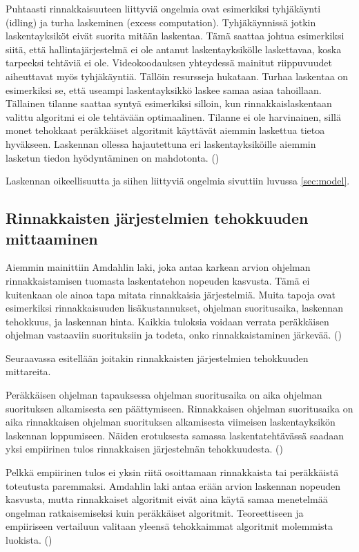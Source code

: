 Puhtaasti rinnakkaisuuteen liittyviä ongelmia ovat esimerkiksi tyhjäkäynti
(idling) ja turha laskeminen (excess computation). Tyhjäkäynnissä jotkin
laskentayksiköt eivät suorita mitään laskentaa. Tämä saattaa johtua esimerkiksi
siitä, että hallintajärjestelmä ei ole antanut laskentayksikölle laskettavaa,
koska tarpeeksi tehtäviä ei ole. Videokoodauksen yhteydessä mainitut
riippuvuudet aiheuttavat myös tyhjäkäyntiä. Tällöin resursseja hukataan. Turhaa
laskentaa on esimerkiksi se, että useampi laskentayksikkö laskee samaa asiaa
tahoillaan. Tällainen tilanne saattaa syntyä esimerkiksi silloin, kun
rinnakkaislaskentaan valittu algoritmi ei ole tehtävään optimaalinen. Tilanne
ei ole harvinainen, sillä monet tehokkaat peräkkäiset algoritmit käyttävät
aiemmin laskettua tietoa hyväkseen. Laskennan ollessa hajautettuna eri
laskentayksiköille aiemmin lasketun tiedon hyödyntäminen on mahdotonta.
(\citealt{intro})

Laskennan oikeellisuutta ja siihen liittyviä ongelmia sivuttiin luvussa
\ref{sec:model}.

\subsection{Rinnakkaisten järjestelmien tehokkuuden mittaaminen}
\label{sec:measurement}

Aiemmin mainittiin Amdahlin laki, joka antaa karkean arvion ohjelman
rinnakkaistamisen tuomasta laskentatehon nopeuden kasvusta. Tämä ei kuitenkaan
ole ainoa tapa mitata rinnakkaisia järjestelmiä. Muita tapoja ovat esimerkiksi
rinnakkaisuuden lisäkustannukset, ohjelman suoritusaika, laskennan
tehokkuus, ja laskennan hinta. Kaikkia tuloksia voidaan verrata peräkkäisen
ohjelman vastaaviin suorituksiin ja todeta, onko rinnakkaistaminen järkevää.
(\citealt{intro})

Seuraavassa esitellään joitakin rinnakkaisten järjestelmien tehokkuuden
mittareita.

Peräkkäisen ohjelman tapauksessa ohjelman suoritusaika on aika ohjelman
suorituksen alkamisesta sen päättymiseen. Rinnakkaisen
ohjelman suoritusaika on aika rinnakkaisen ohjelman suorituksen alkamisesta
viimeisen laskentayksikön laskennan loppumiseen. Näiden
erotuksesta samassa laskentatehtävässä saadaan yksi empiirinen tulos
rinnakkaisen järjestelmän tehokkuudesta. (\citealt{intro})

Pelkkä empiirinen tulos ei yksin riitä osoittamaan rinnakkaista tai peräkkäistä
toteutusta paremmaksi. Amdahlin laki antaa erään arvion laskennan nopeuden
kasvusta, mutta rinnakkaiset algoritmit eivät aina käytä samaa menetelmää
ongelman ratkaisemiseksi kuin peräkkäiset algoritmit. Teoreettiseen ja
empiiriseen vertailuun valitaan yleensä tehokkaimmat algoritmit molemmista
luokista. (\citealt{intro})

